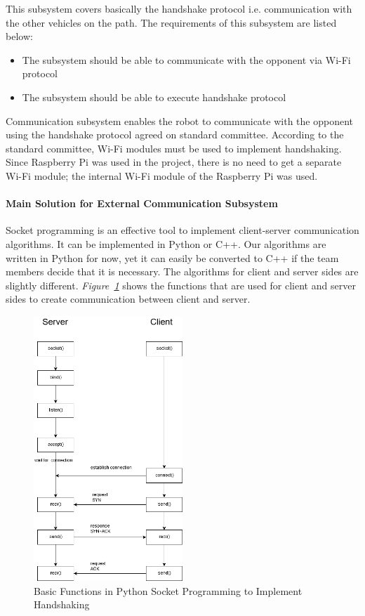 \documentclass[a4paper,12pt]{article}
\begin{document}
	This subsystem covers basically the handshake protocol i.e. communication with the other vehicles on the path. The requirements of this subsystem are listed below:
	\begin{itemize}
		\item The subsystem should be able to communicate with the opponent via Wi-Fi protocol
		\item The subsystem should be able to execute handshake protocol
	\end{itemize}
	
	Communication subsystem enables the robot to communicate with the opponent using the handshake protocol agreed on standard committee. According to the standard committee, Wi-Fi modules must be used to implement handshaking. Since Raspberry Pi was used in the project, there is no need to get a separate Wi-Fi module; the internal Wi-Fi module of the Raspberry Pi was used.
	
	\paragraph{Main Solution for External Communication Subsystem}
	
	Socket programming is an effective tool to implement client-server communication algorithms. It can be implemented in Python or C++.  Our algorithms are written in Python for now, yet it can easily be converted to C++ if the team members decide that it is necessary. The algorithms for client and server sides are slightly different. \textit{Figure~\ref{fig:socket_funcs}} shows the functions that are used for client and server sides to create communication between client and server.
	
	\begin{figure}[h]
		\center
		\setlength{\unitlength}{\textwidth} 
		\includegraphics[width=0.5\textwidth]{images/socket_funcs}
		\caption{\label{fig:socket_funcs}Basic Functions in Python Socket Programming to Implement Handshaking}
	\end{figure}
	
\end{document}
